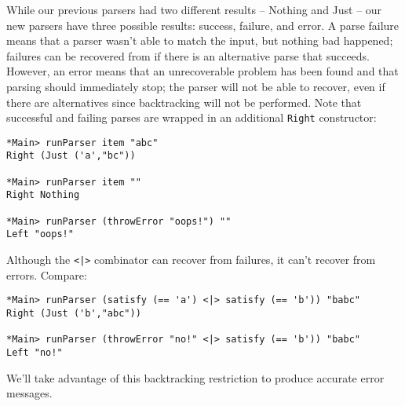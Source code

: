 \documentclass{tmr}
\begin{document}
While our previous parsers had two different results -- Nothing and Just --
our new parsers have three possible results:  success, failure, and error. 
A parse failure means that a parser wasn't able to match the input, but
nothing bad happened; failures can be recovered from if there is an alternative
parse that succeeds.  However, an error means that an unrecoverable problem
has been found and that parsing should immediately stop; the parser will
not be able to recover, even if there are alternatives since backtracking
will not be performed.
Note that successful and failing parses are wrapped in an additional \verb+Right+
constructor:
\begin{verbatim}
*Main> runParser item "abc"
Right (Just ('a',"bc"))

*Main> runParser item ""
Right Nothing

*Main> runParser (throwError "oops!") ""
Left "oops!"
\end{verbatim}

Although the \verb+<|>+ combinator can recover from failures, it can't recover from
errors.  Compare:
\begin{verbatim}
*Main> runParser (satisfy (== 'a') <|> satisfy (== 'b')) "babc"
Right (Just ('b',"abc"))

*Main> runParser (throwError "no!" <|> satisfy (== 'b')) "babc"
Left "no!"
\end{verbatim}
We'll take advantage of this backtracking restriction to produce accurate error
messages.
\end{document}
